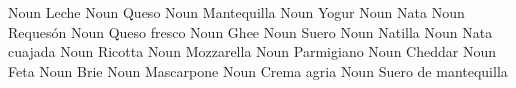                  {}              {Noun}      {Leche}                 {}
               {}              {Noun}      {Queso}                 {}
               {}              {Noun}      {Mantequilla}           {}
              {}              {Noun}      {Yogur}                 {}
                {}              {Noun}      {Nata}                  {}
                 {}              {Noun}      {Requesón}              {}
       {}              {Noun}      {Queso fresco}          {}
                 {}              {Noun}      {Ghee}                  {}
                 {}              {Noun}      {Suero}                 {}
              {}              {Noun}      {Natilla}               {}
        {}              {Noun}      {Nata cuajada}          {}
              {}              {Noun}      {Ricotta}               {}
           {}              {Noun}      {Mozzarella}            {}
             {}              {Noun}      {Parmigiano}            {}
              {}              {Noun}      {Cheddar}               {}
                 {}              {Noun}      {Feta}                  {}
                 {}              {Noun}      {Brie}                  {}
           {}              {Noun}      {Mascarpone}            {}
           {}              {Noun}      {Crema agria}           {}
           {}              {Noun}      {Suero de mantequilla}  {}